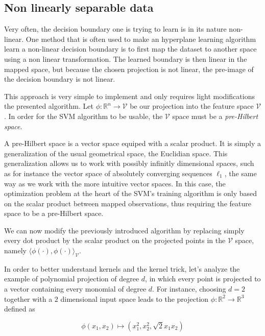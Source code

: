 \subsection{Non linearly separable data}

Very often, the decision boundary one is trying to learn is in its nature non-linear. One method that is often used to make an hyperplane learning algorithm learn a non-linear decision boundary is to first map the dataset to another space using a non linear transformation. The learned boundary is then linear in the mapped space, but because the chosen projection is not linear, the pre-image of the decision boundary is not linear.

This approach is very simple to implement and only requires light modifications the presented algorithm. Let $\phi : \mathbb{R}^n \rightarrow \mathcal{V}$ be our projection into the feature space $\mathcal{V}$. In order for the SVM algorithm to be usable, the $\mathcal{V}$ space must be a \textit{pre-Hilbert space}.

A pre-Hilbert space is a vector space equiped with a scalar product. It is simply a generalization of the usual geometrical space, the Euclidian space. This generalization allows us to work with possibly infinitly dimensional spaces, such as for instance the vector space of absolutely converging sequences $\ell_1$, the same way as we work with the more intuitive vector spaces. In this case, the optimization problem at the heart of the SVM's training algorithm is only based on the scalar product between mapped observations, thus requiring the feature space to be a pre-Hilbert space. 

We can now modify the previously introduced algorithm by replacing simply every dot product by the scalar product on the projected points in the $\mathcal{V}$ space, namely $\langle \phi(\cdot), \phi(\cdot)\rangle _{\mathcal{V}}$.

In order to better understand kernels and the kernel trick, let's analyze the example of polynomial projection of degree $d$, in which every point is projected to a vector containing every monomial of degree $d$. For instance, choosing $d = 2$ together with a $2$ dimensional input space leads to the projection $\phi : \mathbb{R}^2 \rightarrow \mathbb{R}^3$ defined as

\begin{equation*}
    \phi(x_1, x_2) \mapsto (x_1^2, x_2^2, \sqrt{2}x_1x_2)
\end{equation*}

